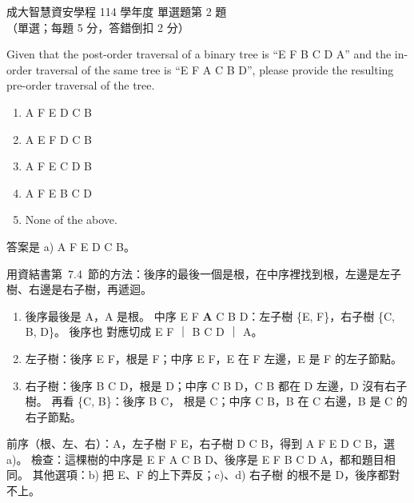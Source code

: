 \begin{pastexam}[label={px:ncku-114-isec-ds-02}]{成大智慧資安學程 114 學年度 單選題第 2 題}
（單選；每題 5 分，答錯倒扣 2 分）

Given that the post-order traversal of a binary tree is ``E F B C D A'' and the in-order traversal of
the same tree is ``E F A C B D'', please provide the resulting pre-order traversal of the tree.
\begin{enumerate}[label=\alph*)]
\item A F E D C B
\item A E F D C B
\item A F E C D B
\item A F E B C D
\item None of the above.
\end{enumerate}
\end{pastexam}

\begin{pastsoln}
答案是 a) A F E D C B。

用資結書第~7.4~節的方法：後序的最後一個是根，在中序裡找到根，左邊是左子樹、右邊是右子樹，再遞迴。
\begin{enumerate}
\item 後序最後是 A，A 是根。 中序 E F \textbf{A} C B D：左子樹 \{E, F\}，右子樹 \{C, B, D\}。 後序也
對應切成 E F ｜ B C D ｜ A。
\item 左子樹：後序 E F，根是 F；中序 E F，E 在 F 左邊，E 是 F 的左子節點。
\item 右子樹：後序 B C D，根是 D；中序 C B D，C B 都在 D 左邊，D 沒有右子樹。 再看 \{C, B\}：後序 B C，
根是 C；中序 C B，B 在 C 右邊，B 是 C 的右子節點。
\end{enumerate}
\begin{center}
\end{center}
前序（根、左、右）：A，左子樹 F E，右子樹 D C B，得到 A F E D C B，選 a)。 檢查：這棵樹的中序是
E F A C B D、後序是 E F B C D A，都和題目相同。 其他選項：b) 把 E、F 的上下弄反；c)、d) 右子樹
的根不是 D，後序都對不上。
\end{pastsoln}

